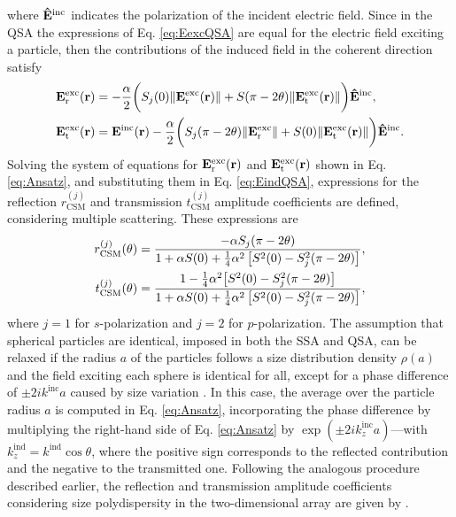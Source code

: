 %
where $\vu{E}^\text{inc}$ indicates the polarization of the incident electric field. Since in the QSA the expressions of Eq. \eqref{eq:EexcQSA} are equal for the electric field exciting a particle, then the contributions of the induced field in the coherent direction satisfy \cite{garcia2012multiple}
%
\begin{subequations}%
	\begin{align}%
		\vb{E}^\text{exc}_\text{r}(\vb{r}) &= -\frac{\alpha}{2} \bigg( S_j(0) \norm{\vb{E}^\text{exc}_\text{r}(\vb{r})} +  S(\pi-2\theta)\norm{\vb{E}^\text{exc}_\text{t}(\vb{r})}\bigg) \vu{E}^\text{inc},\\
		\vb{E}^\text{exc}_\text{t}(\vb{r}) &= \vb{E}^\text{inc}(\vb{r}) -\frac{\alpha}{2} \bigg( S_j(\pi-2\theta) \norm{\vb{E}^\text{exc}_\text{r}} + S(0)\norm{\vb{E}^\text{exc}_\text{t}(\vb{r})} \bigg)
		\vu{E}^\text{inc}.
	\end{align}%
	\label{eq:Ansatz}%
\end{subequations}%
%
Solving the system of equations for $\vb{E}^\text{exc}_\text{r}(\vb{r})$ and $\vb{E}^\text{exc}_\text{t}(\vb{r})$ shown in Eq. \eqref{eq:Ansatz}, and substituting them in Eq. \eqref{eq:EindQSA}, expressions for the reflection $r^{(j)}_\text{CSM}$ and transmission $t^{(j)}_\text{CSM}$ amplitude coefficients are defined, considering multiple scattering. These expressions are \cite{garcia2012multiple,barrera_coherent_2003}
%
\begin{subequations}%
	\begin{align}
		r^{(j)}_\text{CSM}(\theta)&=\frac{-\alpha S_j(\pi-2\theta)}
		{1+\alpha S(0)+\frac14 \alpha^2 \left[S^2(0)-S_j^2 (\pi-2\theta) \right]},\\
		t^{(j)}_\text{CSM}(\theta)&=\frac{1-\frac14\alpha^2\qty[S^2(0)-S_j^2(\pi-2\theta)]}
		{1+\alpha S(0)+\frac14 \alpha^2 \left[S^2(0)-S_j^2 (\pi-2\theta) \right]},
	\end{align}%
	\label{eq:CSMmono}%
\end{subequations}%
%
where $j=1$ for $s$-polarization and $j=2$ for $p$-polarization. The assumption that spherical particles are identical, imposed in both the SSA and QSA, can be relaxed if the radius $a$ of the particles follows a size distribution density $\rho(a)$ and the field exciting each sphere is identical for all, except for a phase difference of $\pm2ik^\text{inc}a$ caused by size variation \cite{vazquez-estrada_optical_2014}. In this case, the average over the particle radius $a$ is computed in Eq. \eqref{eq:Ansatz}, incorporating the phase difference by multiplying the right-hand side of Eq. \eqref{eq:Ansatz} by $\exp(\pm2ik_z^\text{inc} a)$—with $k_z^\text{ind} = k^\text{ind}\cos\theta$, where the positive sign corresponds to the reflected contribution and the negative to the transmitted one. Following the analogous procedure described earlier, the reflection and transmission amplitude coefficients considering size polydispersity in the two-dimensional array are given by \cite{vazquez-estrada_optical_2014}.
